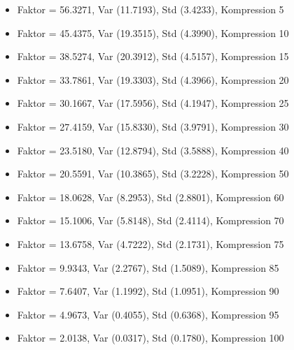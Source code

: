 \begin{itemize}
    \item Faktor = 56.3271, Var (11.7193), Std (3.4233), Kompression 5
    \item Faktor = 45.4375, Var (19.3515), Std (4.3990), Kompression 10
    \item Faktor = 38.5274, Var (20.3912), Std (4.5157), Kompression 15
    \item Faktor = 33.7861, Var (19.3303), Std (4.3966), Kompression 20
    \item Faktor = 30.1667, Var (17.5956), Std (4.1947), Kompression 25
    \item Faktor = 27.4159, Var (15.8330), Std (3.9791), Kompression 30
    \item Faktor = 23.5180, Var (12.8794), Std (3.5888), Kompression 40
    \item Faktor = 20.5591, Var (10.3865), Std (3.2228), Kompression 50
    \item Faktor = 18.0628, Var (8.2953), Std (2.8801), Kompression 60
    \item Faktor = 15.1006, Var (5.8148), Std (2.4114), Kompression 70
    \item Faktor = 13.6758, Var (4.7222), Std (2.1731), Kompression 75
    \item Faktor = 9.9343, Var (2.2767), Std (1.5089), Kompression 85
    \item Faktor = 7.6407, Var (1.1992), Std (1.0951), Kompression 90
    \item Faktor = 4.9673, Var (0.4055), Std (0.6368), Kompression 95
    \item Faktor = 2.0138, Var (0.0317), Std (0.1780), Kompression 100
\end{itemize}


\newpage
